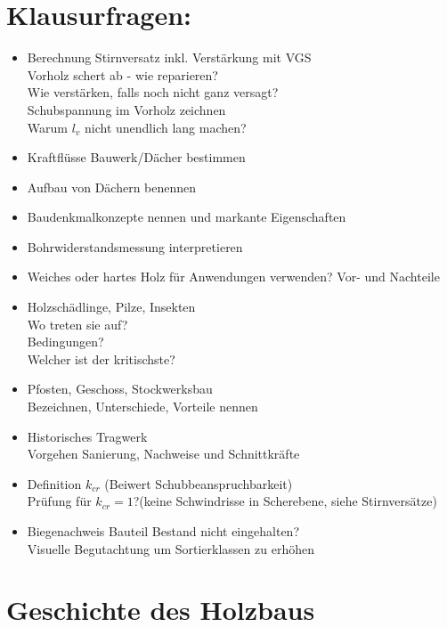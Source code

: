 \documentclass[fleqn,twoside]{article}
\begin{document}
\section{Klausurfragen:}
    \begin{itemize}
        \item Berechnung Stirnversatz inkl. Verstärkung mit VGS \\
        Vorholz schert ab - wie reparieren?\\
        Wie verstärken, falls noch nicht ganz versagt?\\
        Schubspannung im Vorholz zeichnen\\
        Warum $l_v$ nicht unendlich lang machen?
        \item Kraftflüsse Bauwerk/Dächer bestimmen
        \item Aufbau von Dächern benennen
        \item Baudenkmalkonzepte nennen und markante Eigenschaften
        \item Bohrwiderstandsmessung interpretieren
        \item Weiches oder hartes Holz für Anwendungen verwenden? Vor- und Nachteile
        \item Holzschädlinge, Pilze, Insekten\\
        Wo treten sie auf?\\ 
        Bedingungen?\\
        Welcher ist der kritischste?
        \item Pfosten, Geschoss, Stockwerksbau\\
        Bezeichnen, Unterschiede, Vorteile nennen
        \item Historisches Tragwerk\\
        Vorgehen Sanierung, Nachweise und Schnittkräfte
        \item Definition $k_{cr}$ (Beiwert Schubbeanspruchbarkeit) \\
        Prüfung für $k_{cr}=1$?(keine Schwindrisse in Scherebene, siehe Stirnversätze)
        \item Biegenachweis Bauteil Bestand nicht eingehalten?\\
        Visuelle Begutachtung um Sortierklassen zu erhöhen
    \end{itemize}



\newpage
\section{Geschichte des Holzbaus}
\end{document}
